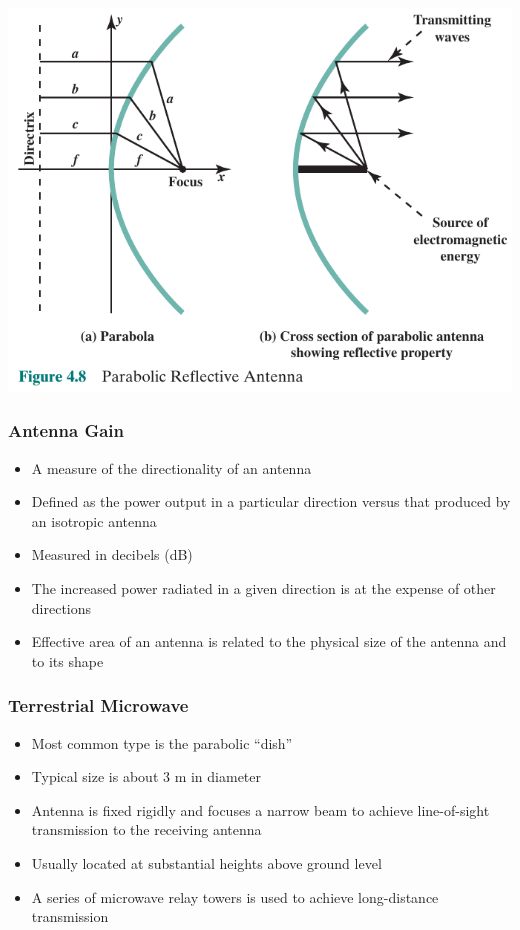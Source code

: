 \documentclass[pdflatex,compress]{beamer}
\begin{document}
\begin{frame}
	\begin{center}
		\includegraphics[height=0.9\textheight]{img/img18}
	\end{center}
\end{frame}

\begin{frame}
	\frametitle{Antenna Gain}
	\begin{itemize}
		\item A measure of the directionality of an antenna
		\item Defined as the power output in a particular direction versus that produced by an isotropic antenna
		\item Measured in decibels (dB)
		\item The increased power radiated in a given direction is at the expense of other directions
		\item Effective area of an antenna is related to the physical size of the antenna and to its shape
	\end{itemize}
\end{frame}

\begin{frame}
	\frametitle{Terrestrial Microwave}
	\begin{itemize}
		\item Most common type is the parabolic “dish”
		\item Typical size is about 3 m in diameter
		\item Antenna is fixed rigidly and focuses a narrow beam to achieve line-of-sight transmission to the receiving antenna
		\item Usually located at substantial heights above ground level
		\item A series of microwave relay towers is used to achieve long-distance transmission
	\end{itemize}
\end{frame}
\end{document}
